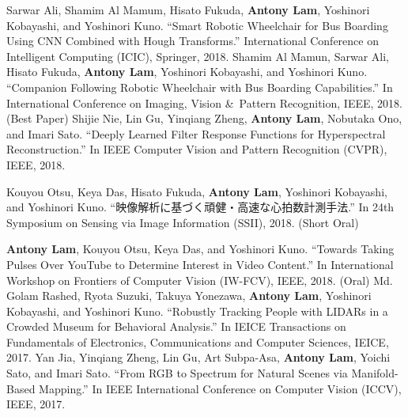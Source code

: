 \documentclass[letterpaper,10pt]{article}
\begin{document}
Sarwar Ali, Shamim Al Mamum, Hisato Fukuda, \textbf{Antony Lam}, Yoshinori Kobayashi, and Yoshinori Kuno. ``Smart Robotic Wheelchair for Bus Boarding Using CNN Combined with Hough Transforms.'' International Conference on Intelligent Computing (ICIC), Springer, 2018. \vspace{0.05in}\newline
Shamim Al Mamun, Sarwar Ali, Hisato Fukuda, \textbf{Antony Lam}, Yoshinori Kobayashi, and Yoshinori Kuno. ``Companion Following Robotic Wheelchair with Bus Boarding Capabilities.'' In International Conference on Imaging, Vision \&\ Pattern Recognition, IEEE, 2018. (Best Paper) \vspace{0.05in}\newline
Shijie Nie, Lin Gu, Yinqiang Zheng, \textbf{Antony Lam}, Nobutaka Ono, and Imari Sato. ``Deeply Learned Filter Response Functions for Hyperspectral Reconstruction.'' In IEEE Computer Vision and Pattern Recognition (CVPR), IEEE, 2018.\vspace{0.05in}\newline
\begin{CJK}{UTF8}{min}Kouyou Otsu, Keya Das, Hisato Fukuda, \textbf{Antony Lam}, Yoshinori Kobayashi, and Yoshinori Kuno. ``映像解析に基づく頑健・高速な心拍数計測手法.'' In 24th Symposium on Sensing via Image Information (SSII), 2018. (Short Oral)\end{CJK}\vspace{0.05in}\newline\newline
\textbf{Antony Lam}, Kouyou Otsu, Keya Das, and Yoshinori Kuno. ``Towards Taking Pulses Over YouTube to Determine Interest in Video Content.'' In International Workshop on Frontiers of Computer Vision (IW-FCV), IEEE, 2018. (Oral)\vspace{0.05in}\newline
Md. Golam Rashed, Ryota Suzuki, Takuya Yonezawa, \textbf{Antony Lam}, Yoshinori Kobayashi, and Yoshinori Kuno. ``Robustly Tracking People with LIDARs in a Crowded Museum for Behavioral Analysis.'' In IEICE Transactions on Fundamentals of Electronics, Communications and Computer Sciences, IEICE, 2017.\vspace{0.05in}\newline
Yan Jia, Yinqiang Zheng, Lin Gu, Art Subpa-Asa, \textbf{Antony Lam}, Yoichi Sato, and Imari Sato. ``From RGB to Spectrum for Natural Scenes via Manifold-Based Mapping.'' In IEEE International Conference on Computer Vision (ICCV), IEEE, 2017.\vspace{0.05in}\newline
\end{document}
